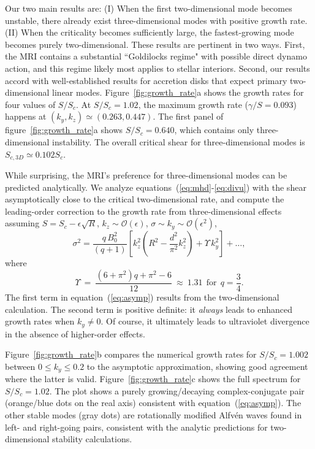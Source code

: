 \documentclass[aps,prl,reprint,superscriptaddress]{revtex4-1}
\newcommand{\SSC}{S/S_{c}}
\begin{document}
Our two main results are: (I) When the first two-dimensional mode becomes unstable, there already exist three-dimensional modes with positive growth rate. (II) When the criticality becomes sufficiently large, the fastest-growing mode becomes purely two-dimensional. These results are pertinent in two ways. First, the MRI contains a substantial ``Goldilocks regime" with possible direct dynamo action, and this regime likely most applies to stellar interiors. Second, our results accord with well-established results for accretion disks that expect primary two-dimensional linear modes.
Figure~\ref{fig:growth_rate}a shows the growth rates for four values of $\SSC$. 
At $\SSC = 1.02$, the maximum growth rate ($\gamma/S = 0.
093$) happens at $(k_y, k_z) \simeq (0.263, 0.447)$.
The first panel of figure~\ref{fig:growth_rate}a shows $\SSC = 0.640$, which contains only three-dimensional instability.
The overall critical shear for three-dimensional modes is $S_{c,3D} \simeq 0.102 S_c$.

While surprising, the MRI's preference for three-dimensional modes can be predicted analytically.
We analyze equations~(\ref{eq:mhd}-\ref{eq:divu}) with the shear asymptotically close to the critical two-dimensional rate, and compute the leading-order correction to the growth rate from three-dimensional effects assuming $S = S_c - \epsilon \sqrt{R}$, $k_{z} \sim \mathcal{O}(\epsilon)$, $\sigma \sim k_{y} \sim \mathcal{O}(\epsilon^{2})$, 
\begin{equation}
  \label{eq:asymp}
\sigma^{2} =  \frac{q\,B_{0}^{2}}{(q+1)} \left[ k_z^2 \left( R^{2} - \frac{d^2}{\pi^{2}} k_z^2 \right)  +  \Upsilon \, k_{y}^{2}  \right] +  \ldots,
\end{equation}
where
\begin{equation}
\Upsilon \ = \ \frac{\left(6+\pi ^2\right) q+\pi^2-6}{12 }\  \approx \ 1.31 \ \  \text{for}  \ \  q = \frac{3}{4}.
\end{equation}
The first term in equation~(\ref{eq:asymp}) results from the two-dimensional calculation.
The second term is positive definite: it \emph{always} leads to enhanced growth rates when $k_y \neq 0$.
Of course, it ultimately leads to ultraviolet divergence in the absence of higher-order effects.

Figure~\ref{fig:growth_rate}b compares the numerical growth rates for $\SSC=1.002$ between $0 \le k_y \le 0.2$ to the asymptotic approximation, showing good agreement where the latter is valid.
Figure~\ref{fig:growth_rate}c shows the full spectrum for $\SSC = 1.02$.
The plot shows a purely growing/decaying complex-conjugate pair (orange/blue dots on the real axis) consistent with equation~(\ref{eq:asymp}).
The other stable modes (gray dots) are rotationally modified Alfv\'{e}n waves found in left- and right-going pairs, consistent with the analytic predictions for two-dimensional stability calculations.
\end{document}
